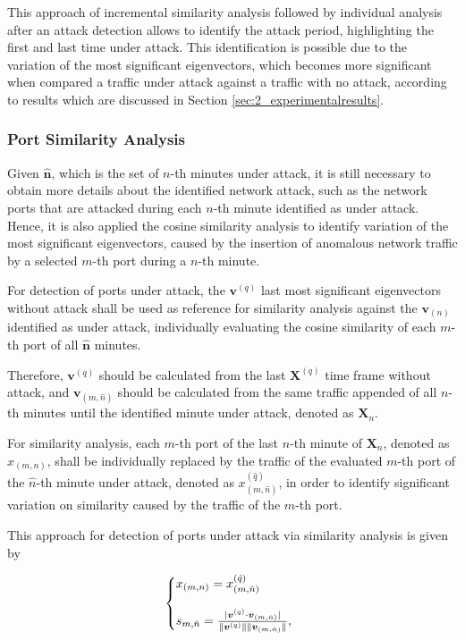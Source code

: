 This approach of incremental similarity analysis followed by individual analysis after an attack detection allows to identify the attack period, highlighting the first and last time under attack. This identification is possible due to the variation of the most significant eigenvectors, which becomes more significant when compared a traffic under attack against a traffic with no attack, according to results which are discussed in Section \ref{sec:2_experimentalresults}.

\subsubsection{Port Similarity Analysis}
\label{sec:2_prop_PortSimilarityAnalysis}

Given $\boldsymbol{\hat{n}}$, which is the set of $n$-th minutes under attack, it is still necessary to obtain more details about the identified network attack, such as the network ports that are attacked during each $n$-th minute identified as under attack. Hence, it is also applied the cosine similarity analysis to identify variation of the most significant eigenvectors, caused by the insertion of anomalous network traffic by a selected $m$-th port during a $n$-th minute. 

For detection of ports under attack, the $\boldsymbol{v}^{(q)}$ last most significant eigenvectors without attack shall be used as reference for similarity analysis against the $\boldsymbol{v}_{(n)}$ identified as under attack, individually evaluating the cosine similarity of each $m$-th port of all $\boldsymbol{\hat{n}}$ minutes.

Therefore, $\boldsymbol{v}^{(q)}$ should be calculated from the last $\boldsymbol{X}^{(q)}$ time frame without attack, and $\boldsymbol{v}_{(m,\hat{n})}$ should be calculated from the same traffic appended of all $n$-th minutes until the identified minute under attack, denoted as $\boldsymbol{X}_n$. 

For similarity analysis, each $m$-th port of the last $n$-th minute of $\boldsymbol{X}_n$, denoted as $x_{(m,n)}$, shall be individually replaced by the traffic of the evaluated $m$-th port of the $\hat{n}$-th minute under attack, denoted as $x^{(\hat{q})}_{(m,\hat{n})}$, in order to identify significant variation on similarity caused by the traffic of the $m$-th port. 

This approach for detection of ports under attack via similarity analysis is given by

\begin{equation}\label{eq:eq15}
  \left\{
  \begin{array}{@{}ll@{}}
    x_{(m,n)} = x^{(\hat{q})}_{(m,\hat{n})} \\
    \\
    s_{m,\hat{n}} = \frac{\abs{\boldsymbol{v}^{(q)} \cdot \boldsymbol{v}_{(m,\hat{n})}}}{\norm{\boldsymbol{v}^{(q)}}\norm{\boldsymbol{v}_{(m,\hat{n})}}},
  \end{array}\right.
\end{equation}

